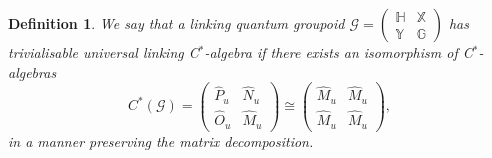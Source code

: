 \documentclass[reqno]{amsart}
\numberwithin{equation}{section}
\newtheorem{Def}[Theorem]{Definition}
\newcommand{\G}{\mathbb{G}}
\newcommand{\Hh}{\mathbb{H}}
\newcommand{\X}{\mathbb{X}}
\newcommand{\Y}{\mathbb{Y}}
\newcommand{\msG}{\mathscr{G}}
\begin{document}
\begin{Def}\label{DefUniversalLift}
We say that a linking quantum groupoid $\msG= \begin{pmatrix} \Hh & \X\\ \Y & \G\end{pmatrix}$ has \emph{trivialisable universal linking C$^*$-algebra} if there exists an isomorphism of C$^*$-algebras
\begin{equation}\label{EqTrivialisationCstar}
C^*(\msG)=\begin{pmatrix} \hat{P}_u & \hat{N}_u\\ \hat{O}_u & \hat{M}_u\end{pmatrix} \cong \begin{pmatrix} \hat{M}_u& \hat{M}_u\\ \hat{M}_u&\hat{M}_u\end{pmatrix},
\end{equation}
in a manner preserving the matrix decomposition. 
\end{Def}
\end{document}
